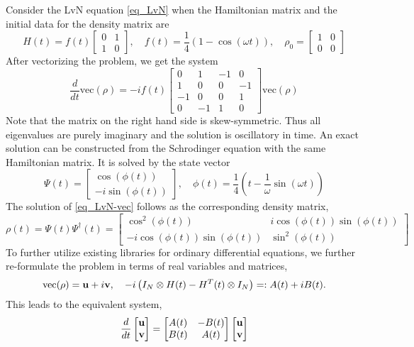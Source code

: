 \documentclass[11pt]{article}
\begin{document}
Consider the LvN equation \eqref{eq_LvN} when the  Hamiltonian matrix and the initial data for the density matrix are
\[
H(t) = f(t)\begin{bmatrix} 0 & 1 \\ 1 & 0 \end{bmatrix},\quad
%
f(t) = \frac{1}{4}\left( 1 - \cos(\omega t) \right),\quad
%
\rho_0 = \begin{bmatrix} 1 & 0 \\ 0 & 0 \end{bmatrix}
\]
After vectorizing the problem, we get the system
\begin{equation}\label{eq_LvN-vec}
\frac{d}{dt}\mbox{vec$(\rho)$} = -i f(t)\begin{bmatrix}
  0 & 1 & -1 & 0 \\
  1 & 0 & 0 & -1 \\
 -1 & 0 & 0 &  1 \\
  0 & -1 & 1 & 0 
  \end{bmatrix}\mbox{vec$(\rho)$}
\end{equation}
Note that the matrix on the right hand side is skew-symmetric. Thus all eigenvalues are purely
imaginary and the solution is oscillatory in time. An exact solution can be constructed from the
Schrodinger equation with the same Hamiltonian matrix. It is solved by the state vector
\[
\Psi(t) = \begin{bmatrix}
\cos(\phi(t)) \\ -i \sin(\phi(t))
  \end{bmatrix},\quad \phi(t) = \frac{1}{4}\left( t - \frac{1}{\omega}\sin(\omega t) \right)
\]
The solution of \eqref{eq_LvN-vec} follows as the corresponding density matrix,
\[
\rho(t) = \Psi(t) \Psi^\dag(t) = \begin{bmatrix}
  \cos^2(\phi(t)) & i \cos(\phi(t)) \sin(\phi(t)) \\
  -i \cos(\phi(t)) \sin(\phi(t)) & \sin^2(\phi(t))
  \end{bmatrix}
\]
To further utilize existing libraries for ordinary differential equations, we further re-formulate
the problem in terms of real variables and matrices,
\[
\mbox{vec$(\rho)$} = {\mathbf u} + i {\mathbf v}, \quad  -i\left( I_N\otimes H(t) - H^T(t) \otimes I_N \right) =:
A(t) + i B(t).
\]
This leads to the equivalent system,
\[
\frac{d}{dt}\begin{bmatrix} \ub \\ \vb \end{bmatrix} =
%
\begin{bmatrix}
  A(t) & -B(t) \\ B(t) & A(t)
\end{bmatrix}
\begin{bmatrix} \ub \\ \vb \end{bmatrix}
\]
\end{document}
